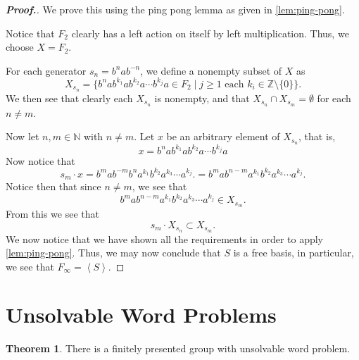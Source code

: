 \documentclass[11pt,a4paper,reqno]{amsart}
\theoremstyle{plain}
\theoremstyle{definition}
\newtheorem{theorem}{Theorem}[section]
\theoremstyle{definition}
\renewcommand\geq\geqslant
\newenvironment{myproof}{\begin{proof}[\normalfont\bfseries Proof.]}{\end{proof}}
\begin{document}
\begin{myproof}
	We prove this using the ping pong lemma as given in \cref{lem:ping-pong}.

	Notice that $F_2$ clearly has a left action on itself by left multiplication.
	Thus, we choose $X = F_2$.

	For each generator $s_n = b^n a b^{-n}$, we define a nonempty subset of $X$ as
	\[
		X_{s_n} = \{
		b^n a b^{k_1} a b^{k_2} a \cdots b^{k_j} a \in F_2
		\mid
		j \geq 1
		\text{ each }k_i \in \mathbb Z \setminus \{0\}
		\}.
	\]
	We then see that clearly each $X_{s_n}$ is nonempty, and that $X_{s_n}\cap X_{s_{m}} = \emptyset$ for each $n\neq m$.

	Now let $n,m\in \mathbb N$ with $n\neq m$.
	Let $x$ be an arbitrary element of $X_{s_n}$, that is,
	\[
		x =
		b^n a b^{k_1} a b^{k_2} a \cdots b^{k_j} a
	\]
	Now notice that
	\[
		s_m \cdot x
		=
		b^{m} a b^{-m}
		b^n a^{k_1} b^{k_2} a^{k_3} \cdots a^{k_j}.
		=
		b^{m} a b^{n-m} a^{k_1} b^{k_2} a^{k_3} \cdots a^{k_j}.
	\]
	Notice then that since $n\neq m$, we see that
	\[
		b^{m} a b^{n-m} a^{k_1} b^{k_2} a^{k_3} \cdots a^{k_j} \in X_{s_m}.
	\]
	From this we see that
	\[
		s_m \cdot X_{s_n} \subset X_{s_m}.
	\]
	We now notice that we have shown all the requirements in order to apply \cref{lem:ping-pong}.
	Thus, we may now conclude that $S$ is a free basis, in particular, we see that $F_\infty = \left\langle S \right\rangle$.
\end{myproof}
\section{Unsolvable Word Problems}

\begin{theorem}\label{thm:unsolvable-wp}
	There is a finitely presented group with unsolvable word problem.
\end{theorem}
\end{document}
